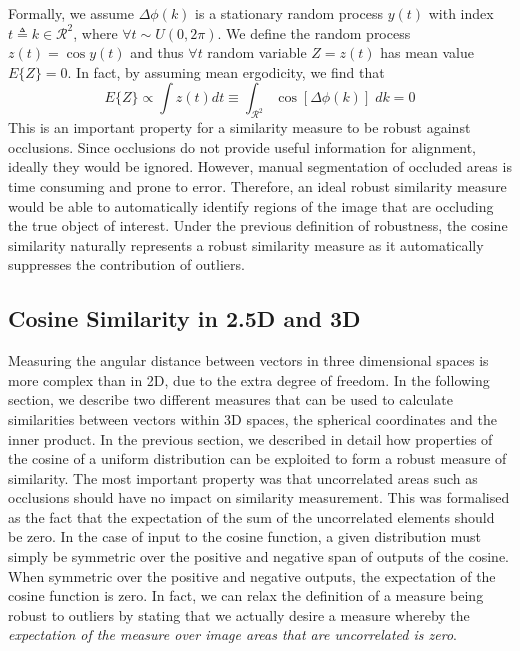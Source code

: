 Formally, we assume $\Delta \phi(k)$ is a stationary random process $y(t)$ with
index $t \triangleq k \in \mathcal{R}^2$, where $\forall t \sim U(0, 2\pi)$. We
define the random process $z(t) = \cos{y(t)}$ and thus $\forall t$ random
variable $Z = z(t)$ has mean value $E\{Z\} = 0$. In fact, by assuming mean
ergodicity, we find that
\begin{equation}\label{eq:cosine_integral}
    E\{Z\} \propto \int z(t) dt \equiv \int_{\mathcal{R}^2} \cos[\Delta \phi(k)] \; dk = 0
\end{equation}
This is an important property for a similarity measure to be robust against
occlusions. Since occlusions do not provide useful information for alignment,
ideally they would be ignored. However, manual segmentation of occluded areas is
time consuming and prone to error. Therefore, an ideal robust similarity measure
would be able to automatically identify regions of the image that are occluding
the true object of interest. Under the previous definition of robustness, the
cosine similarity naturally represents a robust similarity measure as it
automatically suppresses the contribution of outliers.
\subsection{Cosine Similarity in 2.5D and 3D}\label{subsec:cosine_3d}
Measuring the angular distance between vectors in three dimensional spaces
is more complex than in 2D, due to the extra degree of freedom. In the following
section, we describe two different measures that can be used to calculate
similarities between vectors within 3D spaces, the spherical coordinates and the
inner product. In the previous section, we described in detail how properties of
the cosine of a uniform distribution can be exploited to form a robust measure
of similarity. The most important property was that uncorrelated areas such as
occlusions should have no impact on similarity measurement. This was formalised
as the fact that the expectation of the sum of the uncorrelated elements should
be zero. In the case of input to the cosine function, a given distribution must
simply be symmetric over the positive and negative span of outputs of the
cosine. When symmetric over the positive and negative outputs, the expectation
of the cosine function is zero. In fact, we can relax the definition of a
measure being robust to outliers by stating that we actually desire a measure 
whereby the \textit{expectation of the measure over image areas that are 
uncorrelated is zero}. 

